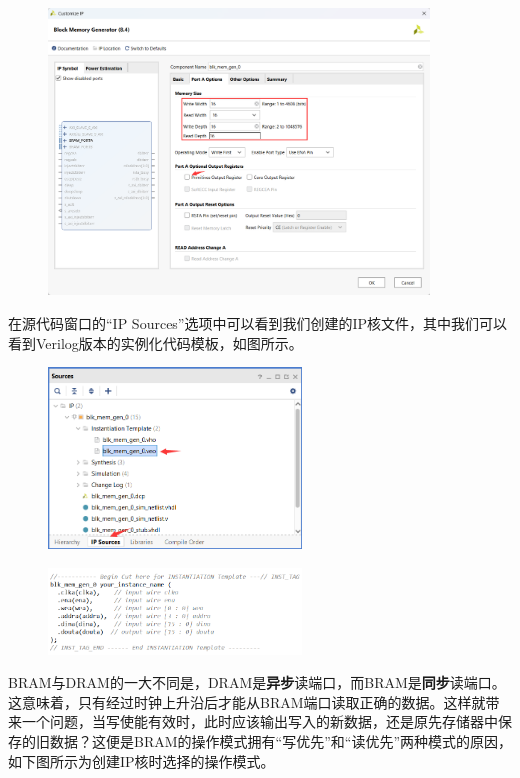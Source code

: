 \documentclass{ctexart}
\begin{document}
\begin{figure}[H]
    \centering
    \includegraphics[width=0.9\textwidth]{lab3/10.png}
\end{figure}

在源代码窗口的“IP Sources”选项中可以看到我们创建的IP核文件，其中我们可以看到Verilog版本的实例化代码模板，如图所示。

\begin{figure}[H]
    \centering
    \includegraphics[width=0.6\textwidth]{lab3/11.png}
\end{figure}

\begin{figure}[H]
    \centering
    \includegraphics[width=0.6\textwidth]{lab3/12.png}
\end{figure}

BRAM与DRAM的一大不同是，DRAM是\textbf{异步}读端口，而BRAM是\textbf{同步}读端口。这意味着，只有经过时钟上升沿后才能从BRAM端口读取正确的数据。这样就带来一个问题，当写使能有效时，此时应该输出写入的新数据，还是原先存储器中保存的旧数据？这便是BRAM的操作模式拥有“写优先”和“读优先”两种模式的原因，如下图所示为创建IP核时选择的操作模式。
\end{document}
